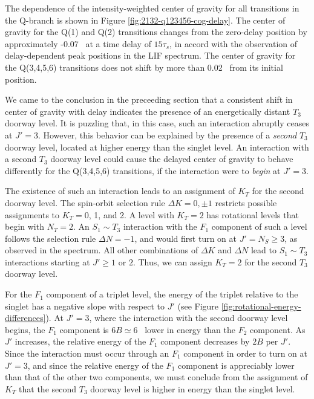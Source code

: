 \documentclass[12pt]{mitthesis}
\begin{document}
The dependence of the intensity-weighted center of gravity for all
transitions in the Q-branch is shown in Figure
\ref{fig:2132-q123456-cog-delay}.  The center of gravity for the Q(1)
and Q(2) transitions changes from the zero-delay position by
approximately -0.07 \rcm\ at a time delay of $15\tau_s$, in accord
with the observation of delay-dependent peak positions in the LIF
spectrum.  The center of gravity for the Q(3,4,5,6) transitions does
not shift by more than 0.02 \rcm\ from its initial position.

We came to the conclusion in the preceeding section that a consistent
shift in center of gravity with delay indicates the presence of an
energetically distant $T_3$ doorway level.  It is puzzling that, in
this case, such an interaction abruptly ceases at $J'=3$.  However,
this behavior can be explained by the presence of a \emph{second}
$T_3$ doorway level, located at higher energy than the singlet level.
An interaction with a second $T_3$ doorway level could cause the
delayed center of gravity to behave differently for the Q(3,4,5,6)
transitions, if the interaction were to \emph{begin} at $J'=3$.

The existence of such an interaction leads to an assignment of $K_T$
for the second doorway level.  The spin-orbit selection rule $\Delta K
= 0, \pm 1$ restricts possible assignments to $K_T=$0, 1, and 2.  A
level with $K_T=2$ has rotational levels that begin with $N_T=2$.  An
$S_1 \sim T_3$ interaction with the $F_1$ component of such a level
follows the selection rule $\Delta N = -1$, and would first turn on at
$J'=N_S \geq 3$, as observed in the spectrum.  All other combinations
of $\Delta K$ and $\Delta N$ lead to $S_1 \sim T_3$ interactions
starting at $J' \geq 1$ or $2$.  Thus, we can assign $K_T=2$ for the
second $T_3$ doorway level.

For the $F_1$ component of a triplet level, the energy of the triplet
relative to the singlet has a negative slope with respect to $J'$ (see
Figure \ref{fig:rotational-energy-differences}).  At $J'=3$, where the
interaction with the second doorway level begins, the $F_1$ component
is $6B \simeq 6$ \rcm\ lower in energy than the $F_2$ component.  As
$J'$ increases, the relative energy of the $F_1$ component decreases
by $2B$ per $J'$.  Since the interaction must occur through an $F_1$
component in order to turn on at $J'=3$, and since the relative energy
of the $F_1$ component is appreciably lower than that of the other two
components, we must conclude from the assignment of $K_T$ that the
second $T_3$ doorway level is higher in energy than the singlet level.
\end{document}

